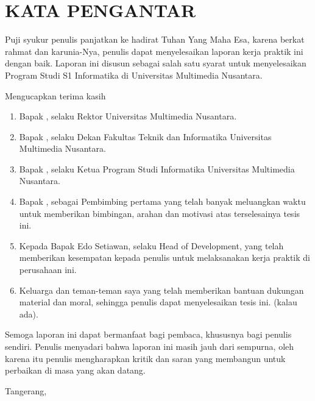 \chapter*{KATA PENGANTAR}

Puji syukur penulis panjatkan ke hadirat Tuhan Yang Maha Esa, karena berkat rahmat dan karunia-Nya, penulis dapat menyelesaikan laporan kerja praktik ini dengan baik. Laporan ini disusun sebagai salah satu syarat untuk menyelesaikan Program Studi S1 Informatika di Universitas Multimedia Nusantara.

\noindent Mengucapkan terima kasih
\begin{enumerate}
	\item Bapak \rektorUMN, selaku Rektor Universitas Multimedia
Nusantara. 
	\item Bapak \dekanFTI, selaku Dekan Fakultas Teknik dan Informatika Universitas Multimedia Nusantara.
	\item Bapak \kaprodi, selaku Ketua Program Studi Informatika Universitas Multimedia Nusantara. 
	\item Bapak \pembimbing,  sebagai Pembimbing pertama yang telah banyak meluangkan
waktu untuk memberikan bimbingan, arahan dan motivasi atas
terselesainya tesis ini.
\item Kepada Bapak Edo Setiawan, selaku Head of Development, yang telah memberikan kesempatan kepada penulis untuk melaksanakan kerja praktik di perusahaan ini.
\item Keluarga dan teman-teman saya yang telah memberikan bantuan
dukungan material dan moral, sehingga penulis dapat menyelesaikan tesis
ini. (kalau ada).
\end{enumerate}
Semoga laporan ini dapat bermanfaat bagi pembaca, khususnya bagi penulis sendiri. Penulis menyadari bahwa laporan ini masih jauh dari sempurna, oleh karena itu penulis mengharapkan kritik dan saran yang membangun untuk perbaikan di masa yang akan datang.

\vspace*{0.1cm}

\begin{flushright}
Tangerang, \tanggalPengumpulan \\[0.1cm]
\vspace*{2cm}
\penulis
\end{flushright}